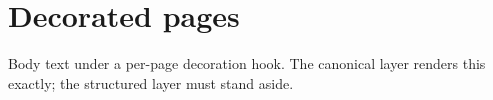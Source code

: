 \documentclass[11pt,a4paper]{article}
\begin{document}
\section{Decorated pages}

Body text under a per-page decoration hook. The canonical layer renders
this exactly; the structured layer must stand aside.
\end{document}
